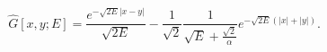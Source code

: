 \begin{equation}
\label{fixed-e3}
\hat{G}[x, y; E] = \frac{e^{-\sqrt{2E} |x - y|}}{\sqrt{2E}}
- \frac{1}{\sqrt{2}}
\frac{1}{\sqrt{E} + \frac{\sqrt{2}}{\alpha}}
e^{-\sqrt{2E} (|x| + |y|)}.
\end{equation}

